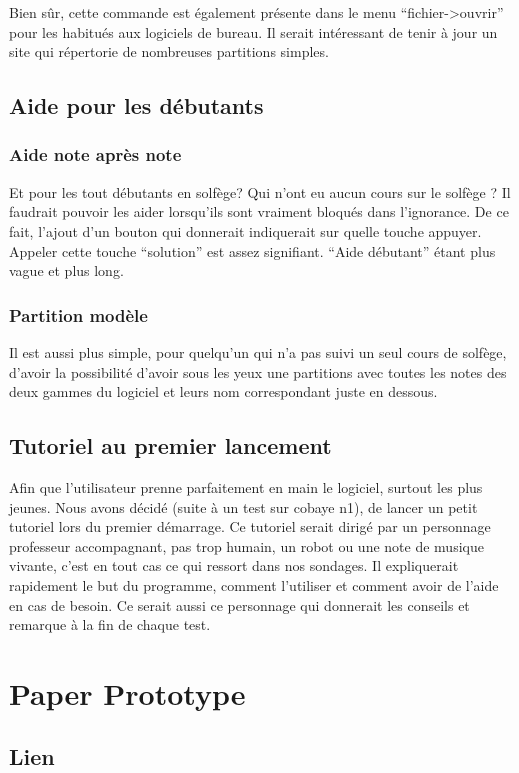 \documentclass{article}
\begin{document}
 
 Bien sûr, cette commande est également présente dans le menu ``fichier->ouvrir'' pour les habitués aux logiciels de bureau.
 Il serait intéressant de tenir à jour un site qui répertorie de nombreuses partitions simples.
\subsection{Aide pour les débutants}
\subsubsection{Aide note après note}
Et pour les tout débutants en solfège? Qui n'ont eu aucun cours sur le solfège ? Il faudrait pouvoir les aider lorsqu'ils sont 
vraiment bloqués dans l'ignorance. De ce fait, l'ajout d'un bouton qui donnerait indiquerait sur quelle touche appuyer.
Appeler cette touche ``solution'' est assez signifiant. ``Aide débutant'' étant plus vague et plus long.
\subsubsection{Partition modèle}
Il est aussi plus simple, pour quelqu'un qui n'a pas suivi un seul cours de solfège, d'avoir la possibilité d'avoir sous les yeux une
partitions avec toutes les notes des deux gammes du logiciel et leurs nom correspondant juste en dessous.
\subsection{Tutoriel au premier lancement}
Afin que l'utilisateur prenne parfaitement en main le logiciel, surtout les plus jeunes. Nous avons décidé (suite à un test sur cobaye n1),
de lancer un petit tutoriel lors du premier démarrage. Ce tutoriel serait dirigé par un personnage professeur accompagnant,
pas trop humain, un robot ou une note de musique vivante, c'est en tout cas ce qui ressort dans nos sondages.
Il expliquerait rapidement le but du programme, comment l'utiliser et comment avoir de l'aide en cas de besoin.
Ce serait aussi ce personnage qui donnerait les conseils et remarque à la fin de chaque test.





\section{Paper Prototype}
\subsection{Lien}
\end{document}
